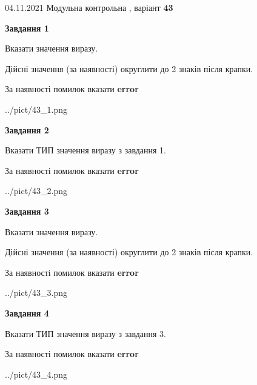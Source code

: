 \documentclass[11pt, ukrainian]{article}
\begin{document}
{04.11.2021 Модульна контрольна , варіант  \No \textbf { 43 }\par}
{
\begin {large}
{\begin {center}\textbf{Завдання 1}\end {center}}\par
Вказати значення виразу. \par
Дійсні значення (за наявності) округлити до 2 знаків після крапки. \par
За наявності помилок вказати \textbf{error}

\begin{center}
	{../pict/43_1.png}
\end{center}
\newpage

{\begin {center}\textbf{Завдання 2}\end {center}}\par
Вказати ТИП значення виразу з завдання 1. \par
За наявності помилок вказати \textbf{error}

\begin{center}
	{../pict/43_2.png}
\end{center}
\newpage

{\begin {center}\textbf{Завдання 3}\end {center}}\par
Вказати значення виразу. \par
Дійсні значення (за наявності) округлити до 2 знаків після крапки. \par
За наявності помилок вказати \textbf{error}

\begin{center}
	{../pict/43_3.png}
\end{center}
\newpage

{\begin {center}\textbf{Завдання 4}\end {center}}\par
Вказати ТИП значення виразу з завдання 3. \par
За наявності помилок вказати \textbf{error}

\begin{center}
	{../pict/43_4.png}
\end{center}
\newpage


\end{large}}
\end{document}
